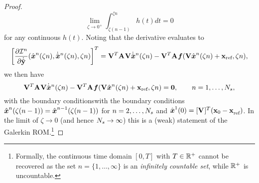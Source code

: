 \begin{proof}
 \begin{equation*}
\lim_{\zeta \rightarrow 0^+}  \int_{\zeta (n-1)}^{\zeta n} h(t) dt = 0
\end{equation*}
for any continuous $h(t)$.
Noting that the derivative evaluates to
\begin{equation*}
\bigg[ \frac{\partial \minintegrandArg{n}}{\partial \dot{\genstateyDiscrete}}(\genstateArg{n}{\zeta n},\genstateDotArg{n}{\zeta n},\zeta n) \bigg]^T=
\basisspace^T \stweightingMatArgt{}{\zeta n} \basisspace \genstateDotArg{n}{\zeta n} -  \basisspace^T \stweightingMatArgt{}{\zeta n} \velocity(\basisspace \genstateArg{n}{\zeta n} + \stateIntercept ,\zeta n), 
\end{equation*}
we then have 
\begin{equation*}
\basisspace^T \stweightingMatArgt{}{\zeta n} \basisspace \genstateDotArg{n}{\zeta n} -  \basisspace^T \stweightingMatArgt{}{\zeta n} \velocity(\basisspace \genstateArg{n}{\zeta n} + \stateIntercept ,\zeta n) = \bz, \qquad n=1,\ldots,\nslabs, 
\end{equation*}
with the boundary conditionswith the boundary conditions  $\genstateArg{n}{\zeta (n-1)} = \genstateArg{n-1}{\zeta(n-1)}$ for $n=2,\ldots,\nslabs$ and $\genstateArg{1}{0} = \genstateIC $. %
In the limit of $\zeta \rightarrow 0$ (and hence $\nslabs \rightarrow \infty$) this is a (weak) statement of the Galerkin ROM.\footnote{Formally, the continuous time domain $[0,T]$ with $T \in \RR{+}$ cannot be recovered as the set $n=\{1,\ldots,\infty\}$ is an \textit{infinitely countable set}, while $\RR{+}$ is uncountable.}
\end{proof}
